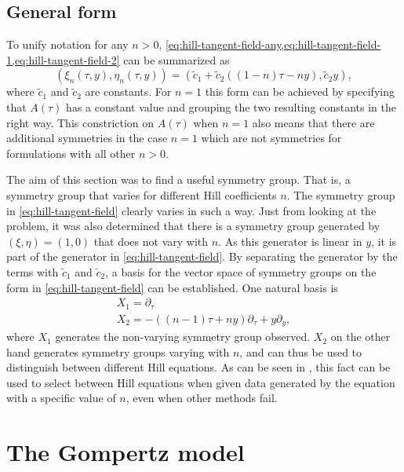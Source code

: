\subsection{General form}

To unify notation for any \(n>0\), \cref{eq:hill-tangent-field-any,eq:hill-tangent-field-1,eq:hill-tangent-field-2} can be summarized as
\begin{equation} \label{eq:hill-tangent-field}
  \left(\xi_n(\tau,y),\eta_n(\tau,y)\right) = 
  \left(\tilde{c}_1 + \tilde{c}_2 \left( (1-n) \tau - n y \right), \tilde{c}_2 y\right),
\end{equation}
where \(\tilde{c}_1\) and \(\tilde{c}_2\) are constants.
For \(n=1\) this form can be achieved by specifying that \(A(\tau)\) has a constant value and grouping the two resulting constants in the right way.
This constriction on \(A(\tau)\) when \(n=1\) also means that there are additional symmetries in the case \(n=1\) which are not symmetries for formulations with all other \(n>0\).

The aim of this section was to find a useful symmetry group.
That is, a symmetry group that varies for different Hill coefficients \(n\).
The symmetry group in \cref{eq:hill-tangent-field} clearly varies in such a way.
Just from looking at the problem, it was also determined that there is a symmetry group generated by \(\left(\xi,\eta\right) = \left(1,0\right)\) that does not vary with \(n\).
As this generator is linear in \(y\), it is part of the generator in \cref{eq:hill-tangent-field}.
By separating the generator by the terms with \(\tilde{c}_1\) and \(\tilde{c}_2\), a basis for the vector space of symmetry groups on the form in \cref{eq:hill-tangent-field} can be established.
One natural basis is
\begin{align*}
  X_1 = \partial_\tau \\
  X_2 = - \left( (n-1) \tau + n y \right) \partial_\tau + y \partial_y,
\end{align*}
where \(X_1\) generates the non-varying symmetry group observed.
\(X_2\) on the other hand generates symmetry groups varying with \(n\), and can thus be used to distinguish between different Hill equations.
As can be seen in \cite{ohlsson2020symmetry}, this fact can be used to select between Hill equations when given data generated by the equation with a specific value of \(n\), even when other methods fail.

\section{The Gompertz model}

